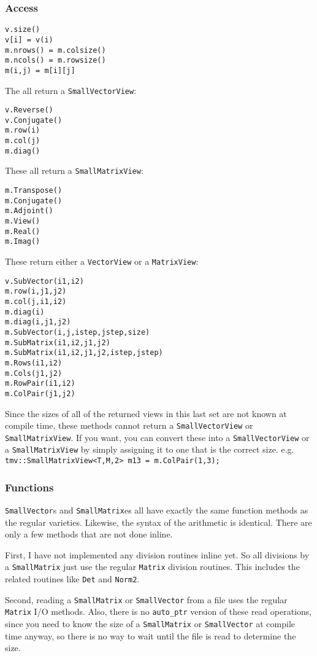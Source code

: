 \documentclass[twoside,letterpaper,11pt]{article}
\renewcommand{\tt}[1]{{\texttt {#1}}}
\begin{document}
\subsubsection{Access}

\begin{verbatim}
v.size()
v[i] = v(i)
m.nrows() = m.colsize()
m.ncols() = m.rowsize()
m(i,j) = m[i][j]
\end{verbatim}
The all return a \tt{SmallVectorView}:
\begin{verbatim}
v.Reverse()
v.Conjugate()
m.row(i)
m.col(j)
m.diag()
\end{verbatim}
These all return a \tt{SmallMatrixView}:
\begin{verbatim}
m.Transpose()
m.Conjugate()
m.Adjoint()
m.View()
m.Real()
m.Imag()
\end{verbatim}
These return either a \tt{VectorView} or a \tt{MatrixView}:
\begin{verbatim}
v.SubVector(i1,i2)
m.row(i,j1,j2)
m.col(j,i1,i2)
m.diag(i)
m.diag(i,j1,j2)
m.SubVector(i,j,istep,jstep,size)
m.SubMatrix(i1,i2,j1,j2)
m.SubMatrix(i1,i2,j1,j2,istep,jstep)
m.Rows(i1,i2)
m.Cols(j1,j2)
m.RowPair(i1,i2)
m.ColPair(j1,j2)
\end{verbatim}
Since the sizes of all of the returned views in this last set are not known at compile time, 
these methods cannot return a \tt{SmallVectorView} or \tt{SmallMatrixView}.  
If you want, you can convert these into a \tt{SmallVectorView}
or a \tt{SmallMatrixView} by simply assigning it to one that is the 
correct size.  e.g. \\
\tt{tmv::SmallMatrixView<T,M,2> m13 = m.ColPair(1,3);}

\subsubsection{Functions}

\tt{SmallVector}s and \tt{SmallMatrix}es all have exactly the same
function methods as the regular varieties.  Likewise, the syntax of the
arithmetic is identical.  There are only a few methods that 
are not done inline.  

First, I have not implemented any division routines inline yet.  So 
all divisions by a \tt{SmallMatrix} just use the regular 
\tt{Matrix} division routines.  This includes the related 
routines like \tt{Det} and \tt{Norm2}.

Second, reading a \tt{SmallMatrix} or \tt{SmallVector} from a file 
uses the regular
\tt{Matrix} I/O methods.  Also, there is no \tt{auto\_ptr} 
version of these read operations, since you need to know the 
size of a \tt{SmallMatrix} or \tt{SmallVector} at compile time anyway, 
so there is no way to wait until the file is read to determine the size.
\end{document}

